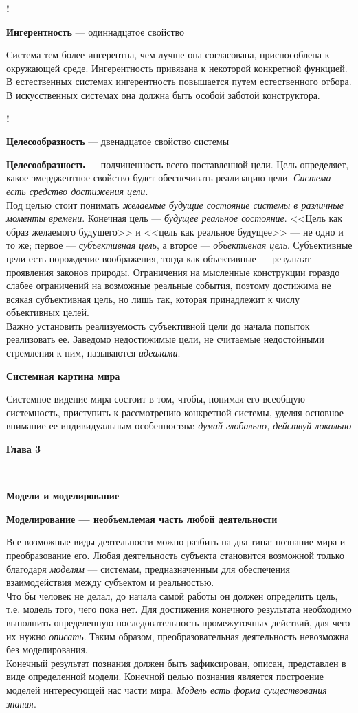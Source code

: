\documentclass{article}
\newcommand{\note}[1]{\textit{#1}}
\renewcommand{\section}[2]{
	\vspace{6em}
	\begin{flushright}
	\Large
	\baselineskip=0.5\baselineskip
	\textbf{#1}
	\\
	\rule[0.5\baselineskip]{\textwidth}{0.15pt}
	\\
	\textbf{#2}
	\end{flushright}
	}
\renewcommand{\subsection}[1]{
	\vspace{2em}
	\begin{flushright}
		\large
		\textbf{#1}
	\end{flushright}
	}
\newcommand{\define}[2]{
	\textbf{#1} --- #2
	}
\newcommand{\marked}[2]{
	\begin{flushright}\textbf{!}\hspace{2ex}\vline\hspace{2ex}
		\begin{minipage}{0.9\textwidth}
			\define{#1}{#2}
		\end{minipage}
	\end{flushright}
	}
\begin{document}
\marked{Ингерентность}{одиннадцатое свойство}
Система тем более ингерентна, чем лучше она согласована, приспособлена к окружающей среде. Ингерентность привязана к некоторой конкретной функцией.\\
В естественных системах ингерентность повышается путем естественного отбора. В искусственных системах она должна быть особой заботой конструктора.
\marked{Целесообразность}{двенадцатое свойство системы}
\define{Целесообразность}{подчиненность всего поставленной цели.}Цель определяет, какое эмерджентное свойство будет обеспечивать реализацию цели. \note{Система есть средство достижения цели}.\\
Под целью стоит понимать \note{желаемые будущие состояние системы в различные моменты времени}. Конечная цель --- \note{будущее реальное состояние}. <<Цель как образ желаемого будущего>> и <<цель как реальное будущее>> --- не одно и то же; первое --- \note{субъективная цель}, а второе --- \note{объективная цель}. Субъективные цели есть порождение воображения, тогда как объективные --- результат проявления законов природы.  Ограничения на мысленные конструкции гораздо слабее ограничений на возможные реальные события, поэтому достижима не всякая субъективная цель, но лишь так, которая принадлежит к числу объективных целей.\\
Важно установить реализуемость субъективной цели до начала попыток реализовать ее. Заведомо недостижимые цели, не считаемые недостойными стремления к ним, называются \note{идеалами}.
\subsection{Системная картина мира}
Системное видение мира состоит в том, чтобы, понимая его всеобщую системность, приступить к рассмотрению конкретной системы, уделяя основное внимание ее индивидуальным особенностям: \note{думай глобально, действуй локально}
\section{Глава 3}{Модели и моделирование}
\subsection{Моделирование --- необъемлемая часть любой деятельности}
Все возможные виды деятельности можно разбить на два типа: познание мира и преобразование его. Любая деятельность субъекта становится возможной только благодаря \note{моделям} --- системам, предназначенным для обеспечения взаимодействия между субъектом и реальностью.\\
Что бы человек не делал, до начала самой работы он должен определить цель, т.е. модель того, чего пока нет. Для достижения конечного результата необходимо выполнить определенную последовательность промежуточных действий, для чего их нужно \note{описать}. Таким образом, преобразовательная деятельность невозможна без моделирования.\\
Конечный результат познания должен быть зафиксирован, описан, представлен в виде определенной модели. Конечной целью познания является построение моделей интересующей нас части мира. \note{Модель есть форма существования знания}.
\end{document}
